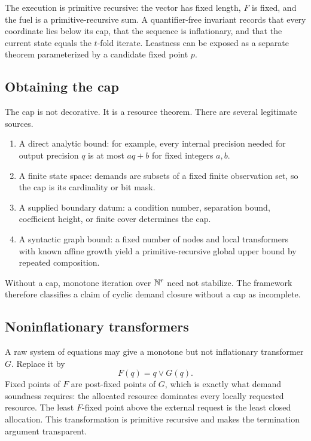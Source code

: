 The execution is primitive recursive: the vector has fixed length, \(F\) is fixed, and the fuel is a
primitive-recursive sum.  A quantifier-free invariant records that every coordinate lies below its cap,
that the sequence is inflationary, and that the current state equals the \(t\)-fold iterate.  Leastness can
be exposed as a separate theorem parameterized by a candidate fixed point \(p\).

\subsection{Obtaining the cap}

The cap is not decorative.  It is a resource theorem.  There are several legitimate sources.

\begin{enumerate}
  \item A direct analytic bound: for example, every internal precision needed for output precision \(q\)
        is at most \(aq+b\) for fixed integers \(a,b\).
  \item A finite state space: demands are subsets of a fixed finite observation set, so the cap is its
        cardinality or bit mask.
  \item A supplied boundary datum: a condition number, separation bound, coefficient height, or finite
        cover determines the cap.
  \item A syntactic graph bound: a fixed number of nodes and local transformers with known affine growth
        yield a primitive-recursive global upper bound by repeated composition.
\end{enumerate}

Without a cap, monotone iteration over \(\mathbb N^r\) need not stabilize.  The framework therefore classifies a
claim of cyclic demand closure without a cap as incomplete.

\subsection{Noninflationary transformers}

A raw system of equations may give a monotone but not inflationary transformer \(G\).  Replace it by
\[
 F(q)=q\vee G(q).
\]
Fixed points of \(F\) are post-fixed points of \(G\), which is exactly what demand soundness requires: the
allocated resource dominates every locally requested resource.  The least \(F\)-fixed point above the
external request is the least closed allocation.  This transformation is primitive recursive and makes the
termination argument transparent.

